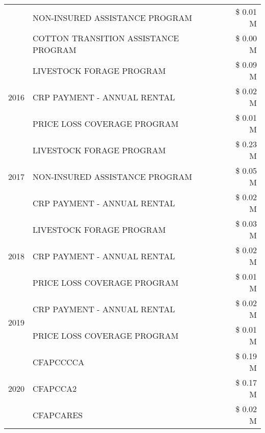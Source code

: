 \begin{tabular}{llr}
 & NON-INSURED ASSISTANCE PROGRAM & \$ 0.01 M \\
 & COTTON TRANSITION ASSISTANCE PROGRAM & \$ 0.00 M \\
\cline{1-3}
\multirow[t]{3}{*}{2016} & LIVESTOCK FORAGE PROGRAM                      & \$ 0.09 M \\
 & CRP PAYMENT - ANNUAL RENTAL                   & \$ 0.02 M \\
 & PRICE LOSS COVERAGE PROGRAM                   & \$ 0.01 M \\
\cline{1-3}
\multirow[t]{3}{*}{2017} & LIVESTOCK FORAGE PROGRAM & \$ 0.23 M \\
 & NON-INSURED ASSISTANCE PROGRAM & \$ 0.05 M \\
 & CRP PAYMENT - ANNUAL RENTAL & \$ 0.02 M \\
\cline{1-3}
\multirow[t]{3}{*}{2018} & LIVESTOCK FORAGE PROGRAM & \$ 0.03 M \\
 & CRP PAYMENT - ANNUAL RENTAL & \$ 0.02 M \\
 & PRICE LOSS COVERAGE PROGRAM & \$ 0.01 M \\
\cline{1-3}
\multirow[t]{2}{*}{2019} & CRP PAYMENT - ANNUAL RENTAL & \$ 0.02 M \\
 & PRICE LOSS COVERAGE PROGRAM & \$ 0.01 M \\
\cline{1-3}
\multirow[t]{3}{*}{2020} & CFAPCCCCA & \$ 0.19 M \\
 & CFAPCCA2 & \$ 0.17 M \\
 & CFAPCARES & \$ 0.02 M \\
\cline{1-3}
\bottomrule
\end{tabular}
